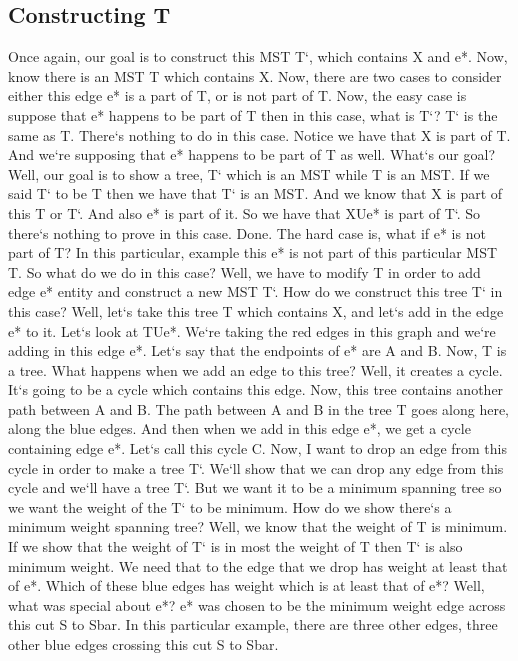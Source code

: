\subsection{Constructing T}
Once again, our goal is to construct this MST T`, which contains X and e*.
Now, know there is an MST T which contains X\@.
Now, there are two cases to consider either this edge e* is a part of T, or is not part of T\@.
Now, the easy case is suppose that e* happens to be part of T then in this case, what is T`? T` is the same as T\@.
There`s nothing to do in this case.
Notice we have that X is part of T\@.
And we`re supposing that e* happens to be part of T as well.
What`s our goal? Well, our goal is to show a tree, T` which is an MST while T is an MST\@.
If we said T` to be T then we have that T` is an MST\@.
And we know that X is part of this T or T`.
And also e* is part of it.
So we have that XUe* is part of T`.
So there`s nothing to prove in this case.
Done.
The hard case is, what if e* is not part of T? In this particular, example this e* is not part of this particular MST T\@.
So what do we do in this case? Well, we have to modify T in order to add edge e* entity and construct a new MST T`.
How do we construct this tree T` in this case? Well, let`s take this tree T which contains X, and let`s add in the edge e* to it.
Let`s look at TUe*.
We`re taking the red edges in this graph and we`re adding in this edge e*.
Let`s say that the endpoints of e* are A and B\@.
Now, T is a tree.
What happens when we add an edge to this tree? Well, it creates a cycle.
It`s going to be a cycle which contains this edge.
Now, this tree contains another path between A and B\@.
The path between A and B in the tree T goes along here, along the blue edges.
And then when we add in this edge e*, we get a cycle containing edge e*.
Let`s call this cycle C\@.
Now, I want to drop an edge from this cycle in order to make a tree T`.
We`ll show that we can drop any edge from this cycle and we`ll have a tree T`.
But we want it to be a minimum spanning tree so we want the weight of the T` to be minimum.
How do we show there`s a minimum weight spanning tree? Well, we know that the weight of T is minimum.
If we show that the weight of T` is in most the weight of T then T` is also minimum weight.
We need that to the edge that we drop has weight at least that of e*.
Which of these blue edges has weight which is at least that of e*? Well, what was special about e*? e* was chosen to be the minimum weight edge across this cut S to Sbar.
In this particular example, there are three other edges, three other blue edges crossing this cut S to Sbar.
